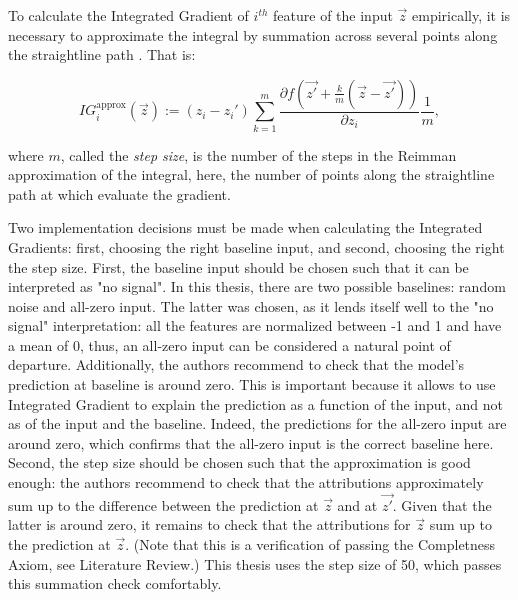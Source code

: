 			To calculate the Integrated Gradient of $i^{th}$ feature of the input $\vec{z}$ empirically, it is necessary to approximate the integral by summation across several points along the straightline path  \citep{sundararajan2017axiomatic}. That is:  
			
			\begin{equation*}
				IG_i^{\text{approx}}(\vec{z}) := (z_i - z_i') \sum_{k=1}^{m} \frac{\partial f(\vec{z'} + \frac{k}{m}(\vec{z}-\vec{z'}))}{\partial z_i}\frac{1}{m},
			\end{equation*} 
	
			where $m$, called the \textit{step size}, is the number of the steps in the Reimman approximation of the integral, here, the number of points along the straightline path at which evaluate the gradient. 
			
			Two implementation decisions must be made when calculating the Integrated Gradients: first, choosing the right baseline input, and second, choosing the right the step size. First, the baseline input should be chosen such that it can be interpreted as "no signal". In this thesis, there are two possible baselines: random noise and all-zero input. The latter was chosen, as it lends itself well to the "no signal" interpretation: all the features are normalized between -1 and 1 and have a mean of 0, thus, an all-zero input can be considered a natural point of departure. Additionally, the authors recommend to check that the model's prediction at baseline is around zero. This is important because it allows to use Integrated Gradient to explain the prediction as a function of the input, and not as of the input and the baseline. Indeed, the predictions for the all-zero input are around zero, which confirms that the all-zero input is the correct baseline here. Second, the step size should be chosen such that the approximation is good enough: the authors recommend to check that the attributions approximately sum up to the difference between the prediction at $\vec{z}$ and at $\vec{z'}$. Given that the latter is around zero, it remains to check that the attributions for $\vec{z}$ sum up to the prediction at $\vec{z}$. (Note that this is a verification of passing the Completness Axiom, see Literature Review.) This thesis uses the step size of 50, which passes this summation check comfortably.  
		
